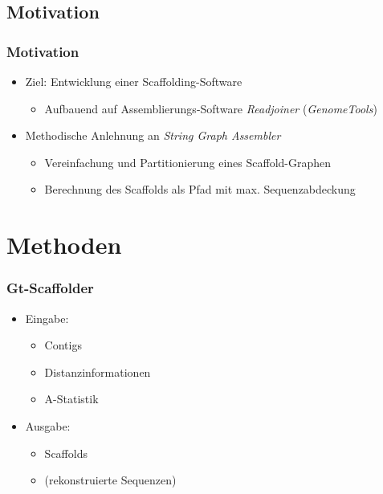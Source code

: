 \documentclass[xcolor=pst]{beamer}
\begin{document}
\subsection{Motivation}
\begin{frame}
  \frametitle{Motivation}
  \begin{itemize}
  \item Ziel: Entwicklung einer Scaffolding-Software
  \begin{itemize}
    \item Aufbauend auf Assemblierungs-Software \textit{Readjoiner} (\textit{GenomeTools})
  \end{itemize}
  \item Methodische Anlehnung an \textit{String Graph Assembler}
  \begin{itemize}
    \item Vereinfachung und Partitionierung eines Scaffold-Graphen
    \item Berechnung des Scaffolds als Pfad mit max. Sequenzabdeckung
  \end{itemize}
  \end{itemize}
  \let\thefootnote\relax{}
\end{frame}

\section{Methoden}

\begin{frame}
  \frametitle{Gt-Scaffolder}
  \begin{itemize}
  \item Eingabe:
    \begin{itemize}
    \item Contigs
    \item Distanzinformationen
    \item A-Statistik %
    \end{itemize}
  \item Ausgabe:
    \begin{itemize}
    \item Scaffolds
    \item (rekonstruierte Sequenzen)
    \end{itemize}
  \end{itemize}
\end{frame}
\end{document}

